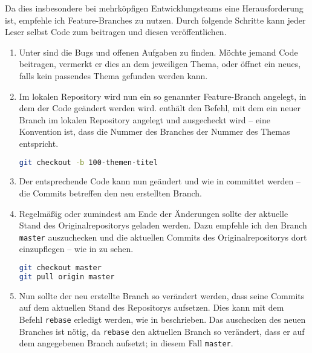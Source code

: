 Da dies insbesondere bei mehrköpfigen Entwicklungsteams eine Herausforderung ist, empfehle ich Feature-Branches zu nutzen. Durch folgende Schritte kann jeder Leser selbst Code zum \md beitragen und diesen veröffentlichen.
\begin{enumerate}
\item Unter  sind die Bugs und offenen Aufgaben zu finden. Möchte jemand Code beitragen, vermerkt er dies an dem jeweiligen Thema, oder öffnet ein neues, falls kein passendes Thema gefunden werden kann.

\item Im lokalen Repository wird nun ein so genannter Feature-Branch angelegt, in dem der Code geändert werden wird.  enthält den Befehl, mit dem ein neuer Branch im lokalen Repository angelegt und ausgecheckt wird -- eine Konvention ist, dass die Nummer des Branches der Nummer des Themas entspricht.

\begin{lstlisting}[language=sh,caption={Einen Branch mit git erstellen},label=\lstlbl{git-branch-erstellen}]
git checkout -b 100-themen-titel
\end{lstlisting}

\item Der entsprechende Code kann nun geändert und wie in  committet werden -- die Commits betreffen den neu erstellten Branch.

\item Regelmäßig oder zumindest am Ende der Änderungen sollte der aktuelle Stand des Originalrepositorys geladen werden. Dazu empfehle ich den Branch \texttt{master} auszuchecken und die aktuellen Commits des Originalrepositorys dort einzupflegen -- wie in  zu sehen.

\begin{lstlisting}[language=sh,caption={Mit git den Branch \texttt{master} auschecken und aktualisieren},label=\lstlbl{git-master-aktualisieren}]
git checkout master
git pull origin master
\end{lstlisting}

\item Nun sollte der neu erstellte Branch so verändert werden, dass seine Commits auf dem aktuellen Stand des Repositorys aufsetzen. Dies kann mit dem Befehl \texttt{rebase} erledigt werden, wie in  beschrieben. Das auschecken des neuen Branches ist nötig, da \texttt{rebase} den aktuellen Branch so verändert, dass er auf dem angegebenen Branch aufsetzt; in diesem Fall \texttt{master}.


\end{enumerate}
